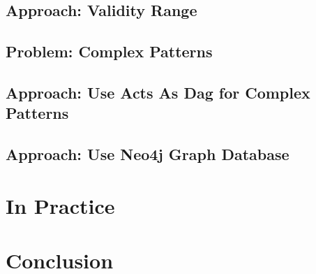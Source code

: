 \documentclass[green, 12pt]{beamer}
\begin{document}
\subsection{Approach: Validity Range}

\subsection{Problem: Complex Patterns}

\subsection{Approach: Use Acts As Dag for Complex Patterns}

\subsection{Approach: Use Neo4j Graph Database}


\section{In Practice}


\section{Conclusion}


\end{document}
